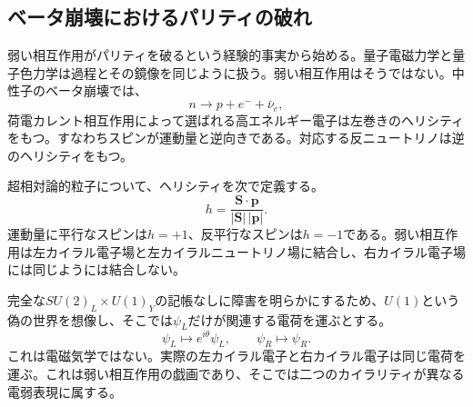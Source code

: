 \subsection{ベータ崩壊におけるパリティの破れ}

弱い相互作用がパリティを破るという経験的事実から始める。量子電磁力学と量子色力学は過程とその鏡像を同じように扱う。弱い相互作用はそうではない。中性子のベータ崩壊では、\begin{equation}
  n\longrightarrow p+e^-+\bar\nu_e,
  \label{eq:l09-beta-decay}
\end{equation}
荷電カレント相互作用によって選ばれる高エネルギー電子は左巻きのヘリシティをもつ。すなわちスピンが運動量と逆向きである。対応する反ニュートリノは逆のヘリシティをもつ。

超相対論的粒子について、ヘリシティを次で定義する。
\begin{equation}
  h=\frac{\bm S\cdot\bm p}{|\bm S|\,|\bm p|}.
\end{equation}
運動量に平行なスピンは\(h=+1\)、反平行なスピンは\(h=-1\)である。弱い相互作用は左カイラル電子場と左カイラルニュートリノ場に結合し、右カイラル電子場には同じようには結合しない。

完全な\(SU(2)_L\times U(1)_Y\)の記帳なしに障害を明らかにするため、\(U(1)\)という偽の世界を想像し、そこでは\(\psi_L\)だけが関連する電荷を運ぶとする。
\begin{equation}
  \psi_L\longmapsto e^{i\theta}\psi_L,
  \qquad
  \psi_R\longmapsto\psi_R .
  \label{eq:l09-chiral-toy-charge}
\end{equation}
これは電磁気学ではない。実際の左カイラル電子と右カイラル電子は同じ電荷を運ぶ。これは弱い相互作用の戯画であり、そこでは二つのカイラリティが異なる電弱表現に属する。

\begin{classroomqa}
\end{classroomqa}

